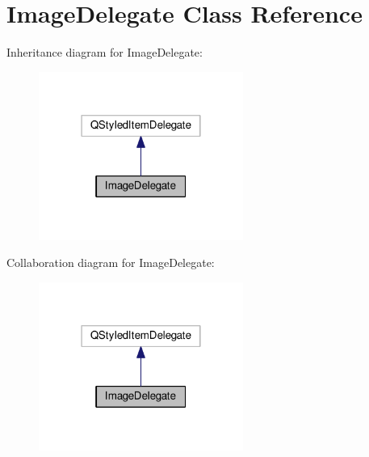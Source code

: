 \hypertarget{classImageDelegate}{}\section{Image\+Delegate Class Reference}
\label{classImageDelegate}


Inheritance diagram for Image\+Delegate\+:\nopagebreak
\begin{figure}[H]
\begin{center}
\leavevmode
\includegraphics[width=190pt]{classImageDelegate__inherit__graph}
\end{center}
\end{figure}


Collaboration diagram for Image\+Delegate\+:\nopagebreak
\begin{figure}[H]
\begin{center}
\leavevmode
\includegraphics[width=190pt]{classImageDelegate__coll__graph}
\end{center}
\end{figure}
